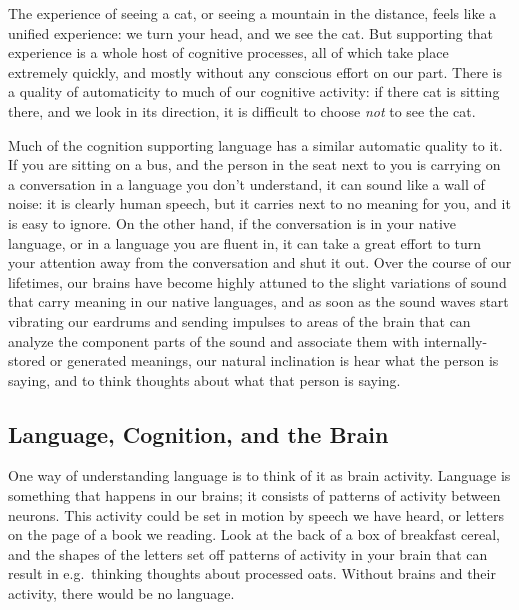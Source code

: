\documentclass[
]{article}
\begin{document}
The experience of seeing a cat, or seeing a mountain in the distance, feels like a unified experience: we turn your head, and we see the cat. But supporting that experience is a whole host of cognitive processes, all of which take place extremely quickly, and mostly without any conscious effort on our part. There is a quality of automaticity to much of our cognitive activity: if there cat is sitting there, and we look in its direction, it is difficult to choose \emph{not} to see the cat.

Much of the cognition supporting language has a similar automatic quality to it. If you are sitting on a bus, and the person in the seat next to you is carrying on a conversation in a language you don't understand, it can sound like a wall of noise: it is clearly human speech, but it carries next to no meaning for you, and it is easy to ignore. On the other hand, if the conversation is in your native language, or in a language you are fluent in, it can take a great effort to turn your attention away from the conversation and shut it out. Over the course of our lifetimes, our brains have become highly attuned to the slight variations of sound that carry meaning in our native languages, and as soon as the sound waves start vibrating our eardrums and sending impulses to areas of the brain that can analyze the component parts of the sound and associate them with internally-stored or generated meanings, our natural inclination is hear what the person is saying, and to think thoughts about what that person is saying.

\hypertarget{language-cognition-and-the-brain}{%
\subsection{Language, Cognition, and the Brain}\label{language-cognition-and-the-brain}}

One way of understanding language is to think of it as brain activity. Language is something that happens in our brains; it consists of patterns of activity between neurons. This activity could be set in motion by speech we have heard, or letters on the page of a book we reading. Look at the back of a box of breakfast cereal, and the shapes of the letters set off patterns of activity in your brain that can result in e.g.~thinking thoughts about processed oats. Without brains and their activity, there would be no language.
\end{document}
